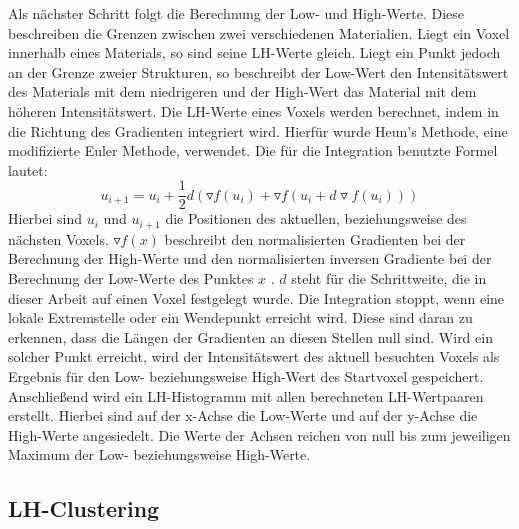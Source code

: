Als nächster Schritt folgt die Berechnung der Low- und High-Werte. Diese beschreiben die Grenzen zwischen zwei verschiedenen Materialien. Liegt ein Voxel innerhalb eines Materials, so sind seine LH-Werte gleich. Liegt ein Punkt jedoch an der Grenze zweier Strukturen, so beschreibt der Low-Wert den Intensitätswert des Materials mit dem niedrigeren und der High-Wert das Material mit dem höheren Intensitätswert. Die LH-Werte eines Voxels werden berechnet, indem in die Richtung des Gradienten integriert wird. Hierfür wurde Heun's Methode, eine modifizierte Euler Methode, verwendet. Die für die Integration benutzte Formel lautet:
\begin{equation}
	u_{i+1} = u_{i} + \frac{1}{2}d(\triangledown f (u_{i}) + \triangledown f(u_{i}+d \triangledown f(u_{i}))) 
\end{equation}
Hierbei sind $u_{i}$ und $u_{i+1}$ die Positionen des aktuellen, beziehungsweise des nächsten Voxels. $\triangledown f(x)$ beschreibt den normalisierten Gradienten bei der Berechnung der High-Werte und den normalisierten inversen Gradiente bei der Berechnung der Low-Werte des Punktes $x$ . $d$ steht für die Schrittweite, die in dieser Arbeit auf einen Voxel festgelegt wurde.
\newline
Die Integration stoppt, wenn eine lokale Extremstelle oder ein Wendepunkt erreicht wird. Diese sind daran zu erkennen, dass die Längen der Gradienten an diesen Stellen null sind. Wird ein solcher Punkt erreicht, wird der Intensitätswert des aktuell besuchten Voxels als Ergebnis für den Low- beziehungsweise High-Wert des Startvoxel gespeichert.
\newline
Anschließend wird ein LH-Histogramm mit allen berechneten LH-Wertpaaren erstellt. Hierbei sind auf der x-Achse die Low-Werte und auf der y-Achse die High-Werte angesiedelt. Die Werte der Achsen reichen von null bis zum jeweiligen Maximum der Low- beziehungsweise High-Werte.



\subsection{LH-Clustering}

